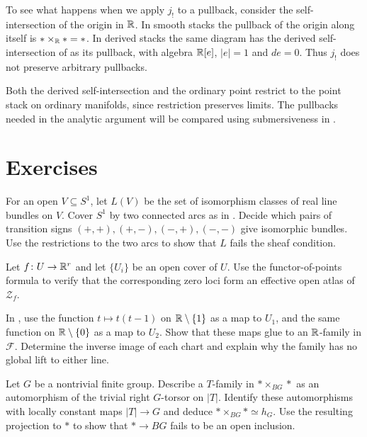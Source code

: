 To see what happens when we apply $j_!$ to a pullback, consider
the self-intersection of the origin in $\mathbb{R}$. In smooth
stacks the pullback of the origin along itself is $*\times_{\mathbb{R}} *=*$.
In derived stacks the same diagram has the derived self-intersection
of  as its pullback, with
algebra $\mathbb{R}[e]$, $|e|=1$ and $de=0$. Thus $j_!$ does not preserve
arbitrary pullbacks.

Both the derived self-intersection and the ordinary point restrict to
the point stack on ordinary manifolds, since restriction preserves limits.
The pullbacks needed in the analytic argument will be compared using
submersiveness in .

\section{Exercises}

\begin{exercise}
For an open $V\subseteq S^1$, let $L(V)$ be the set of isomorphism
classes of real line bundles on $V$. Cover $S^1$ by two connected arcs
as in . Decide which pairs of
transition signs $(+,+),(+,-),(-,+),(-,-)$ give isomorphic bundles.
Use the restrictions to the two arcs to show that $L$ fails the
sheaf condition.
\end{exercise}

\begin{exercise}
Let $f\colon U\to\mathbb{R}^r$ and let $\{U_i\}$ be an open cover of $U$.
Use the functor-of-points formula to verify that the corresponding
zero loci form an effective open atlas of $\mathcal Z_f$.
\end{exercise}

\begin{exercise}
In , use the function $t\mapsto t(t-1)$
on $\mathbb{R}\setminus\{1\}$ as a map to $U_1$, and the same function on
$\mathbb{R}\setminus\{0\}$ as a map to $U_2$. Show that these maps glue to an
$\mathbb{R}$-family in $\mathcal F$. Determine the inverse image of each chart
and explain why the family has no global lift to either line.
\end{exercise}

\begin{exercise}
Let $G$ be a nontrivial finite group. Describe a $T$-family in
$*\times_{BG}*$ as an automorphism of the trivial right $G$-torsor
on $|T|$. Identify these automorphisms with locally constant maps
$|T|\to G$ and deduce $*\times_{BG}*\simeq h_G$. Use the resulting
projection to $*$ to show that $*\to BG$ fails to be an open inclusion.
\end{exercise}

